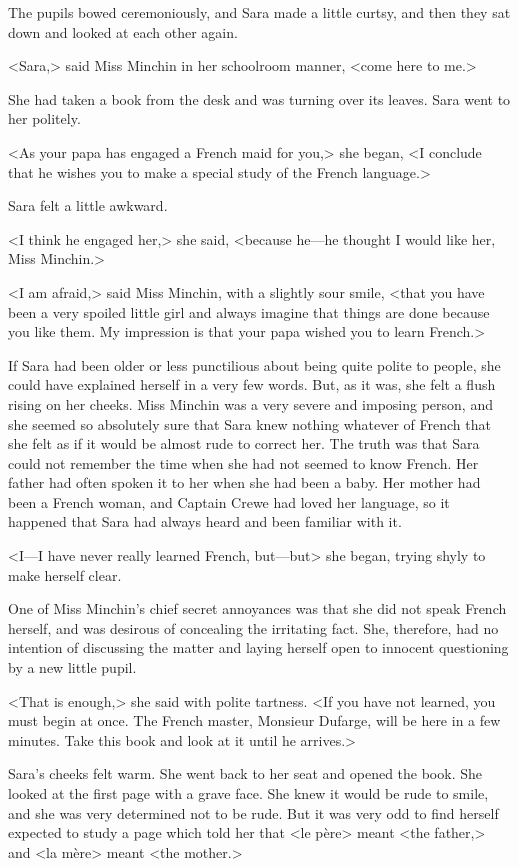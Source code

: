 The pupils bowed ceremoniously, and Sara made a little curtsy, and then they sat down and looked at each other again.

<Sara,> said Miss Minchin in her schoolroom manner, <come here to me.>

She had taken a book from the desk and was turning over its leaves. Sara went to her politely.

<As your papa has engaged a French maid for you,> she began, <I conclude that he wishes you to make a special study of the French language.>

Sara felt a little awkward.

<I think he engaged her,> she said, <because he—he thought I would like her, Miss Minchin.>

<I am afraid,> said Miss Minchin, with a slightly sour smile, <that you have been a very spoiled little girl and always imagine that things are done because you like them. My impression is that your papa wished you to learn French.>

If Sara had been older or less punctilious about being quite polite to people, she could have explained herself in a very few words. But, as it was, she felt a flush rising on her cheeks. Miss Minchin was a very severe and imposing person, and she seemed so absolutely sure that Sara knew nothing whatever of French that she felt as if it would be almost rude to correct her. The truth was that Sara could not remember the time when she had not seemed to know French. Her father had often spoken it to her when she had been a baby. Her mother had been a French woman, and Captain Crewe had loved her language, so it happened that Sara had always heard and been familiar with it.

<I—I have never really learned French, but—but\longdash> she began, trying shyly to make herself clear.

One of Miss Minchin's chief secret annoyances was that she did not speak French herself, and was desirous of concealing the irritating fact. She, therefore, had no intention of discussing the matter and laying herself open to innocent questioning by a new little pupil.

<That is enough,> she said with polite tartness. <If you have not learned, you must begin at once. The French master, Monsieur Dufarge, will be here in a few minutes. Take this book and look at it until he arrives.>

Sara's cheeks felt warm. She went back to her seat and opened the book. She looked at the first page with a grave face. She knew it would be rude to smile, and she was very determined not to be rude. But it was very odd to find herself expected to study a page which told her that <le père> meant <the father,> and <la mère> meant <the mother.>

